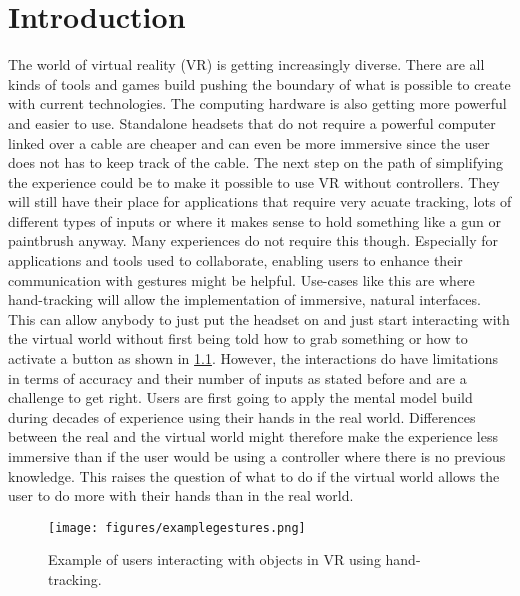 
\chapter{Introduction}
The world of virtual reality (VR) is getting increasingly diverse. There are all kinds of tools and games build pushing the boundary of what is possible to create with current technologies. The computing hardware is also getting more powerful and easier to use. Standalone headsets that do not require a powerful computer linked over a cable are cheaper and can even be more immersive since the user does not has to keep track of the cable. The next step on the path of simplifying the experience could be to make it possible to use VR without controllers. They will still have their place for applications that require very acuate tracking, lots of different types of inputs or where it makes sense to hold something like a gun or paintbrush anyway. Many experiences do not require this though. Especially for applications and tools used to collaborate, enabling users to enhance their communication with gestures might be helpful. Use-cases like this are where hand-tracking will allow the implementation of immersive, natural interfaces. This can allow anybody to just put the headset on and just start interacting with the virtual world without first being told how to grab something or how to activate a button as shown in \ref{fig:example}. However, the interactions do have limitations in terms of accuracy and their number of inputs as stated before and are a challenge to get right. Users are first going to apply the mental model build during decades of experience using their hands in the real world. Differences between the real and the virtual world might therefore make the experience less immersive than if the user would be using a controller where there is no previous knowledge. This raises the question of what to do if the virtual world allows the user to do more with their hands than in the real world. 

\begin{figure}[!ht]
    \centering
    \texttt{[image: figures/examplegestures.png]}
    \caption{Example of users interacting with objects in VR using hand-tracking. \cite{Han}}
    \label{fig:example}
\end{figure}


